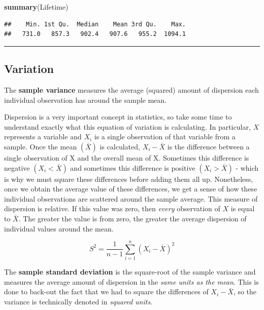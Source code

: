 \documentclass[
]{book}
\newenvironment{Shaded}{\begin{snugshade}}{\end{snugshade}}
\newcommand{\FunctionTok}[1]{\textcolor[rgb]{0.13,0.29,0.53}{\textbf{#1}}}
\newcommand{\NormalTok}[1]{#1}
\begin{document}
\begin{Shaded}
\begin{Highlighting}[]
\FunctionTok{summary}\NormalTok{(Lifetime)}
\end{Highlighting}
\end{Shaded}

\begin{verbatim}
##    Min. 1st Qu.  Median    Mean 3rd Qu.    Max. 
##   731.0   857.3   902.4   907.6   955.2  1094.1
\end{verbatim}

\begin{center}\rule{0.5\linewidth}{0.5pt}\end{center}

\subsection{Variation}\label{variation}

The \textbf{sample variance} measures the average (squared) amount of dispersion each individual observation has around the sample mean.

Dispersion is a very important concept in statistics, so take some time to understand exactly what this equation of variation is calculating. In particular, \(X\) represents a variable and \(X_i\) is a single observation of that variable from a sample. Once the mean \((\bar{X})\) is calculated, \(X_i - \bar{X}\) is the difference between a single observation of X and the overall mean of X. Sometimes this difference is negative \((X_i < \bar{X})\) and sometimes this difference is positive \((X_i > \bar{X})\) - which is why we must square these differences before adding them all up. Nonetheless, once we obtain the average value of these differences, we get a sense of how these individual observations are scattered around the sample average. This measure of dispersion is relative. If this value was zero, then \emph{every} observation of \(X\) is equal to \(\bar{X}\). The greater the value is from zero, the greater the average dispersion of individual values around the mean.

\[S^2=\frac{1}{n-1}\sum\limits_{i=1}^n(X_i-\bar{X})^2\]

The \textbf{sample standard deviation} is the square-root of the sample variance and measures the average amount of dispersion in the \emph{same units as the mean}. This is done to back-out the fact that we had to square the differences of \(X_i - \bar{X}\), so the variance is technically denoted in \emph{squared units}.
\end{document}
